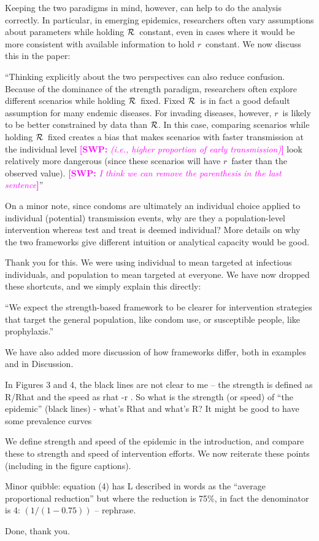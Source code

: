 \documentclass[12pt]{article}
\newcommand{\rr}{\ensuremath{{r}}}
\newcommand{\RR}{\ensuremath{{\cal R}}}
\newcommand{\revtext}{\textsf}
\newcommand{\comment}[3]{\textcolor{#1}{\textbf{[#2: }\textsl{#3}\textbf{]}}}
\newcommand{\swp}[1]{\comment{magenta}{SWP}{#1}}
\begin{document}
Keeping the two paradigms in mind, however, can help to do the analysis correctly.
In particular, in emerging epidemics, researchers often vary assumptions about parameters while holding \RR\ constant, even in cases where it would be more consistent with available information to hold \rr\ constant.
We now discuss this in the paper:

``Thinking explicitly about the two perspectives can also reduce confusion. Because of the dominance of the strength paradigm, researchers often explore different scenarios while holding \RR\ fixed. Fixed \RR\ is in fact a good default assumption for many endemic diseases. For invading diseases, however, \rr\ is likely to be better constrained by data than \RR. In this case, comparing scenarios while holding \RR\ fixed creates a bias that makes scenarios with faster transmission at the individual level \swp{(i.e., higher proportion of early transmission)} look relatively more dangerous (since these scenarios will have \rr\ faster than the observed value). \swp{I think we can remove the parenthesis in the last sentence}''

\revtext{
On a minor note, since condoms are ultimately an individual choice
applied to individual (potential) transmission events, why are they a
population-level intervention whereas test and treat is deemed
individual? More details on why the two frameworks give different
intuition or analytical capacity would be good.
}

Thank you for this. We were using individual to mean targeted at
infectious individuals, and population to mean targeted at everyone. We
have now dropped these shortcuts, and we simply explain this directly:

``We expect the strength-based framework to be clearer for intervention strategies that target the general population, like condom use, or susceptible people, like prophylaxis.''

We have also added more discussion of how frameworks differ, both in examples and in Discussion.

\revtext{In Figures 3 and 4, the black lines are not clear to me -- the strength
is defined as R/Rhat and the speed as rhat -r . So what is the strength
(or speed) of ``the epidemic'' (black lines) - what's Rhat and what's R?
It might be good to have some prevalence curves}

We define strength and speed of the epidemic in the introduction, and
compare these to strength and speed of intervention efforts. We now
reiterate these points (including in the figure captions).

\revtext{
Minor quibble: equation (4) has L described in words as the ``average
proportional reduction'' but where the reduction is 75\%, in fact the
denominator is 4: $(1 / (1-0.75) )$ -- rephrase.
}

Done, thank you.
\end{document}
